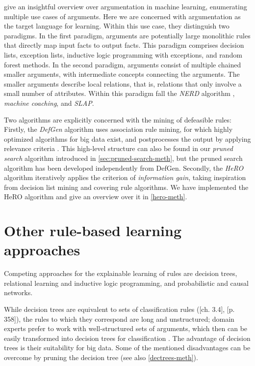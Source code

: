 \cite{kakasAbductionArgumentationExplainable2020} give an insightful overview over argumentation in machine learning, enumerating multiple use cases of arguments. Here we are concerned with argumentation as the target language for learning. Within this use case, they distinguish two paradigms. In the first paradigm, arguments are potentially large monolithic rules that directly map input facts to output facts. This paradigm comprises decision lists, exception lists, inductive logic programming with exceptions, and random forest methods. In the second paradigm, arguments consist of multiple chained smaller arguments, with intermediate concepts connecting the arguments. The smaller arguments describe local relations, that is, relations that only involve a small number of attributes. Within this paradigm fall the \textit{NERD} algorithm \citep{michaelCognitiveReasoningLearning2016}, \textit{machine coaching}, and \textit{SLAP}.

Two algorithms are explicitly concerned with the mining of defeasible rules: Firstly, the \textit{DefGen} algorithm uses association rule mining, for which highly optimized algorithms for big data exist, and postprocesses the output by applying relevance criteria \citep{governatoriApplicationAssociationRules2001}. This high-level structure can also be found in our \textit{pruned search} algorithm introduced in \autoref{sec:pruned-search-meth}, but the pruned search algorithm has been developed independently from DefGen. Secondly, the \textit{HeRO} algorithm iteratively applies the criterion of \textit{information gain}, taking inspiration from decision list mining and covering rule algorithms. We have implemented the HeRO algorithm and give an overview over it in \autoref{hero-meth}.

\section{Other rule-based learning approaches}

Competing approaches for the explainable learning of rules are decision trees, relational learning and inductive logic programming, and probabilistic and causal networks.

While decision trees are equivalent to sets of classification rules (\cite{wittenDataMiningPractical2017}[ch. 3.4], \cite{hanDataMiningConcepts2011}[p. 358]), the rules to which they correspond are long and unstructured; domain experts prefer to work with well-structured sets of arguments, which then can be easily transformed into decision trees for classification \citep{breidenbachTextCode2021}. The advantage of decision trees is their suitability for big data. Some of the mentioned disadvantages can be overcome by pruning the decision tree (see also \autoref{dectrees-meth}).

